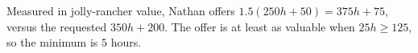 Measured in jolly-rancher value, Nathan offers $1.5(250h+50)=375h+75$, versus the requested $350h+200$. The offer is at least as valuable when $25h\ge125$, so the minimum is $\boxed5$ hours.
